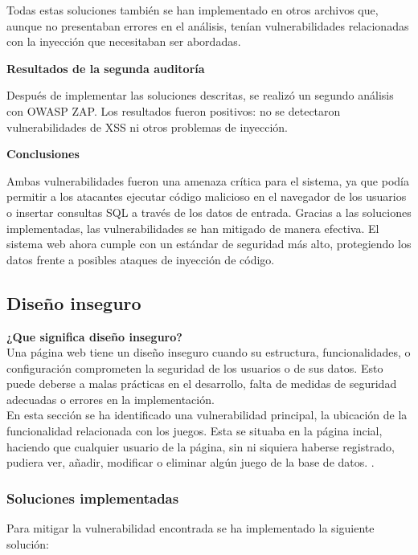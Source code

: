 \documentclass[a4paper,12pt]{article}
\begin{document}
Todas estas soluciones también se han implementado en otros archivos que, aunque no presentaban errores en el análisis, tenían vulnerabilidades relacionadas con la inyección que necesitaban ser abordadas.

\vspace{1em}

\textbf{Resultados de la segunda auditoría}

Después de implementar las soluciones descritas, se realizó un segundo análisis con OWASP ZAP. Los resultados fueron positivos: no se detectaron vulnerabilidades de XSS ni otros problemas de inyección.

\vspace{1em}

\textbf{Conclusiones}

Ambas vulnerabilidades fueron una amenaza crítica para el sistema, ya que podía permitir a los atacantes ejecutar código malicioso en el navegador de los usuarios o insertar consultas SQL a través de los datos de entrada. Gracias a las soluciones implementadas, las vulnerabilidades se han mitigado de manera efectiva. El sistema web ahora cumple con un estándar de seguridad más alto, protegiendo los datos frente a posibles ataques de inyección de código.

\vspace{1em}

\subsection{Diseño inseguro}
\vspace{1em}
\textbf{¿Que significa diseño inseguro?\\}
Una página web tiene un diseño inseguro cuando su estructura, funcionalidades, o configuración comprometen la seguridad de los usuarios o de sus datos. Esto puede deberse a malas prácticas en el desarrollo, falta de medidas de seguridad adecuadas o errores en la implementación.\\

En esta sección se ha identificado una vulnerabilidad principal, la ubicación de la funcionalidad relacionada con los juegos. Esta se situaba en la página incial, haciendo que cualquier usuario de la página, sin ni siquiera haberse registrado, pudiera ver, añadir, modificar o eliminar algún juego de la base de datos.
.
\vspace{1em}
\subsubsection{Soluciones implementadas}
Para mitigar la vulnerabilidad encontrada se ha implementado la siguiente solución:
\end{document}
